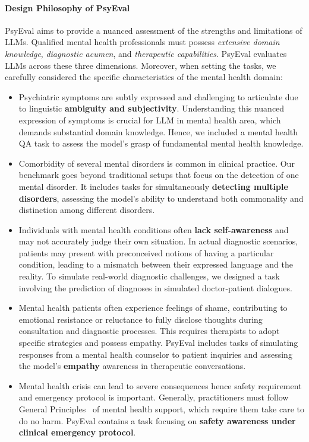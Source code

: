 \paragraph{Design Philosophy of PsyEval} PsyEval aims to provide a nuanced assessment of the strengths and limitations of LLMs. 
Qualified mental health professionals must possess \textit{extensive domain knowledge}, \textit{diagnostic acumen}, and 
\textit{therapeutic capabilities}. PsyEval evaluates LLMs across these three dimensions. Moreover, when setting the tasks, we carefully considered the specific characteristics of the mental health domain:
\begin{itemize}
    \item Psychiatric symptoms are subtly expressed and challenging to articulate due to linguistic \textbf{ambiguity and subjectivity}. Understanding this nuanced expression of symptoms is crucial for LLM in mental health area, which demands substantial domain knowledge. Hence, we included a mental health QA task to assess the model's grasp of fundamental mental health knowledge.
    \item Comorbidity of several mental disorders is common in clinical practice. Our benchmark goes beyond traditional setups that focus on the detection of one mental disorder. It includes tasks for simultaneously \textbf{detecting multiple disorders}, assessing the model's ability to understand both commonality and distinction among different disorders. 
    \item Individuals with mental health conditions often \textbf{lack self-awareness} and may not accurately judge their own situation. In actual diagnostic scenarios, patients may present with preconceived notions of having a particular condition, leading to a mismatch between their expressed language and the reality. To simulate real-world diagnostic challenges, we designed a task involving the prediction of diagnoses in simulated doctor-patient dialogues.
    \item Mental health patients often experience feelings of shame, contributing to emotional resistance or reluctance to fully disclose thoughts during consultation and diagnostic processes. This requires therapists to adopt specific strategies and possess empathy. PsyEval includes tasks of simulating responses from a mental health counselor to patient inquiries and assessing the model's \textbf{empathy} awareness in therapeutic conversations.
    \item Mental health crisis can lead to severe consequences hence safety requirement and emergency protocol is important. Generally, practitioners must follow General Principles~\cite{apa_ethical_principles_2002} of mental health support, which require them take care to do no harm. PsyEval contains a task focusing on \textbf{safety awareness under clinical emergency protocol}. %
\end{itemize}

